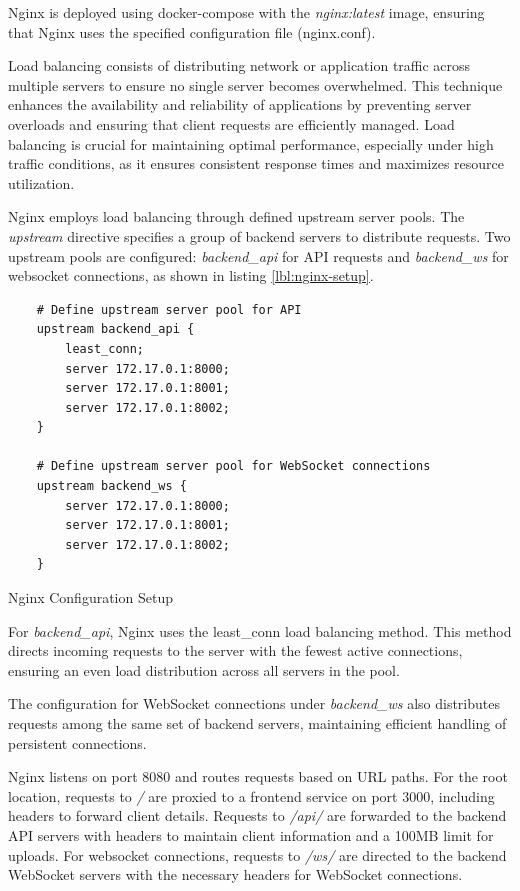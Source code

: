 Nginx is deployed using docker-compose with the \textit{nginx:latest} image, ensuring that Nginx uses the specified 
configuration file (nginx.conf).

Load balancing consists of distributing network or application traffic across multiple servers to ensure no single 
server becomes overwhelmed. This technique enhances the availability and reliability of applications by preventing 
server overloads and ensuring that client requests are efficiently managed. Load balancing is crucial for maintaining 
optimal performance, especially under high traffic conditions, as it ensures consistent response times and maximizes 
resource utilization.

Nginx employs load balancing through defined upstream server pools. The \textit{upstream} directive specifies a group of 
backend servers to distribute requests. Two upstream pools are configured: \textit{backend\_api} for API requests 
and \textit{backend\_ws} for websocket connections, as shown in listing \ref{lbl:nginx-setup}.


\begin{listing}[h]
    \begin{verbatim}
    # Define upstream server pool for API
    upstream backend_api {
        least_conn;
        server 172.17.0.1:8000;
        server 172.17.0.1:8001;
        server 172.17.0.1:8002; 
    }

    # Define upstream server pool for WebSocket connections
    upstream backend_ws {
        server 172.17.0.1:8000;
        server 172.17.0.1:8001;
        server 172.17.0.1:8002;
    }
    \end{verbatim}
    \caption{Nginx Configuration Setup}
    \label{lbl:nginx-setup}
    \end{listing}

For \textit{backend\_api}, Nginx uses the least\_conn load balancing method. This method directs incoming requests to the 
server with the fewest active connections, ensuring an even load distribution across all servers in the pool.

The configuration for WebSocket connections under \textit{backend\_ws} also distributes requests among the same set of
backend servers, maintaining efficient handling of persistent connections.

Nginx listens on port 8080 and routes requests based on URL paths.
For the root location, requests to \textit{/} are proxied to a frontend service on port 3000, including 
headers to forward client details. Requests to \textit{/api/} are forwarded to the backend API servers with headers 
to maintain client information and a 100MB limit for uploads.
For websocket connections, requests to \textit{/ws/} are directed to the backend WebSocket servers with the necessary 
headers for WebSocket connections.

